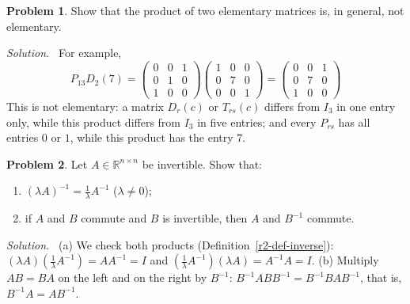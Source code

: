 \documentclass[12pt]{article}
\newcommand{\R}{\mathbb R}
\theoremstyle{definition}
\newtheorem{problem}{Problem}
\newenvironment{solution}{\par\noindent\textit{Solution.}\ }{\par\smallskip}
\begin{document}
\begin{problem}\label{r2-ex-product-elementary}
Show that the product of two elementary matrices is, in general, not elementary.
\end{problem}
\begin{solution}
For example,
\[
P_{13}D_2(7)=\begin{pmatrix}0&0&1\\0&1&0\\1&0&0\end{pmatrix}\begin{pmatrix}1&0&0\\0&7&0\\0&0&1\end{pmatrix}
=\begin{pmatrix}0&0&1\\0&7&0\\1&0&0\end{pmatrix}
\]
This is not elementary: a matrix \(D_r(c)\) or \(T_{rs}(c)\) differs from \(I_3\) in one entry
only, while this product differs from \(I_3\) in five entries; and every \(P_{rs}\) has all
entries \(0\) or \(1\), while this product has the entry \(7\).
\end{solution}

\begin{problem}\label{r2-ex-inverse-props}
Let \(A\in\R^{n\times n}\) be invertible. Show that:
\begin{enumerate}
\item \((\lambda A)^{-1}=\frac1\lambda A^{-1}\) (\(\lambda\ne0\));
\item if \(A\) and \(B\) commute and \(B\) is invertible, then \(A\) and \(B^{-1}\) commute.
\end{enumerate}
\end{problem}
\begin{solution}
(a) We check both products (Definition~\ref{r2-def-inverse}):
\((\lambda A)(\frac1\lambda A^{-1})=AA^{-1}=I\) and \((\frac1\lambda A^{-1})(\lambda A)=A^{-1}A=I\).
(b) Multiply \(AB=BA\) on the left and on the right by \(B^{-1}\):
\(B^{-1}ABB^{-1}=B^{-1}BAB^{-1}\), that is, \(B^{-1}A=AB^{-1}\).
\end{solution}
\end{document}
